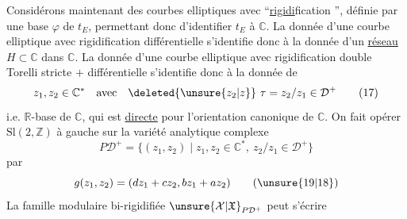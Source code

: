 Considérons maintenant des courbes elliptiques
 avec ``\uline{rigidi}fication '', définie
par une base $\varphi$ de $t_E$, permettant donc
d'identifier $t_E$ à $\mathbb C$. La donnée d'une
courbe elliptique avec rigidification différentielle
s'identifie donc à la donnée d'un \uline{réseau}
$H\subset\mathbb C$ dans $\mathbb C$. La donnée d'une courbe
elliptique avec rigidification double Torelli
stricte $+$ différentielle s'identifie donc à
la donnée de
\[
z_1,z_2\in\mathbb C^*
\quad\text{avec}\quad
\deleted{\unsure{z_2|z}}\ \tau=z_2/z_1\in\mathcal D^+
\tag{17}
\]
i.e. 
$\mathbb R$-base de $\mathbb C$,
qui est \uline{directe} pour l'orientation canonique
de $\mathbb C$. On fait opérer $\mathrm{Sl}(2,\mathbb Z)$ à
gauche sur la variété analytique
complexe
\[
P\mathcal D^+=\{(z_1,z_2)\mid z_1,z_2\in\mathbb C^*,\ z_2/z_1\in\mathcal D^+\}
\tag{18}
\]
par
\[
g(z_1,z_2)=(dz_1+cz_2,bz_1+az_2)
\tag{\unsure{19|18}}
\]
La famille modulaire bi-rigidifiée $\unsure{\mathcal X|\mathfrak X}_{P\mathcal D^+}$
peut s'écrire
